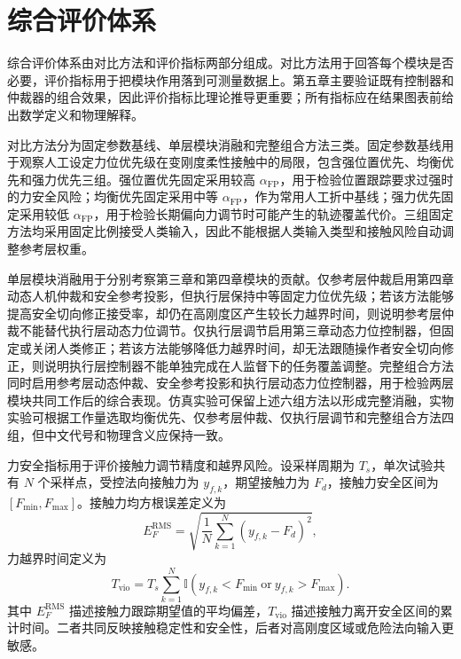 \section{综合评价体系}
\label{sec:ch5_metrics}

综合评价体系由对比方法和评价指标两部分组成。对比方法用于回答每个模块是否必要，评价指标用于把模块作用落到可测量数据上。第五章主要验证既有控制器和仲裁器的组合效果，因此评价指标比理论推导更重要；所有指标应在结果图表前给出数学定义和物理解释。

对比方法分为固定参数基线、单层模块消融和完整组合方法三类。固定参数基线用于观察人工设定力位优先级在变刚度柔性接触中的局限，包含强位置优先、均衡优先和强力优先三组。强位置优先固定采用较高 $\alpha_{\mathrm{FP}}$，用于检验位置跟踪要求过强时的力安全风险；均衡优先固定采用中等 $\alpha_{\mathrm{FP}}$，作为常用人工折中基线；强力优先固定采用较低 $\alpha_{\mathrm{FP}}$，用于检验长期偏向力调节时可能产生的轨迹覆盖代价。三组固定方法均采用固定比例接受人类输入，因此不能根据人类输入类型和接触风险自动调整参考层权重。

单层模块消融用于分别考察第三章和第四章模块的贡献。仅参考层仲裁启用第四章动态人机仲裁和安全参考投影，但执行层保持中等固定力位优先级；若该方法能够提高安全切向修正接受率，却仍在高刚度区产生较长力越界时间，则说明参考层仲裁不能替代执行层动态力位调节。仅执行层调节启用第三章动态力位控制器，但固定或关闭人类修正；若该方法能够降低力越界时间，却无法跟随操作者安全切向修正，则说明执行层控制器不能单独完成在人监督下的任务覆盖调整。完整组合方法同时启用参考层动态仲裁、安全参考投影和执行层动态力位控制器，用于检验两层模块共同工作后的综合表现。仿真实验可保留上述六组方法以形成完整消融，实物实验可根据工作量选取均衡优先、仅参考层仲裁、仅执行层调节和完整组合方法四组，但中文代号和物理含义应保持一致。

力安全指标用于评价接触力调节精度和越界风险。设采样周期为 $T_s$，单次试验共有 $N$ 个采样点，受控法向接触力为 $y_{f,k}$，期望接触力为 $F_d$，接触力安全区间为 $[F_{\min},F_{\max}]$。接触力均方根误差定义为
\begin{equation}
  E_F^{\mathrm{RMS}}=
  \sqrt{\frac{1}{N}\sum_{k=1}^{N}\left(y_{f,k}-F_d\right)^2},
  \label{eq:ch5_metric_force_rms}
\end{equation}
力越界时间定义为
\begin{equation}
  T_{\mathrm{vio}}=
  T_s\sum_{k=1}^{N}\mathbb I\left(y_{f,k}<F_{\min}\ \mathrm{or}\ y_{f,k}>F_{\max}\right).
  \label{eq:ch5_metric_violation_time}
\end{equation}
其中 $E_F^{\mathrm{RMS}}$ 描述接触力跟踪期望值的平均偏差，$T_{\mathrm{vio}}$ 描述接触力离开安全区间的累计时间。二者共同反映接触稳定性和安全性，后者对高刚度区域或危险法向输入更敏感。

